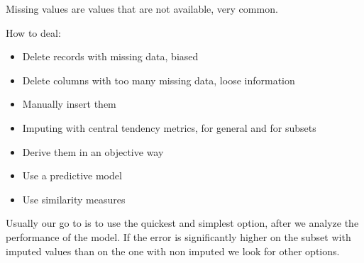 Missing values are values that are not available, very common. 

How to deal:
\begin{itemize}
    \item Delete records with missing data, biased
    \item Delete columns with too many missing data, loose information
    \item Manually insert them
    \item Imputing with central tendency metrics, for general and for subsets
    \item Derive them in an objective way
    \item Use a predictive model
    \item Use similarity measures
\end{itemize}

\vspace{10pt}

Usually our go to is to use the quickest and simplest option, after we analyze the performance of the model.
If the error is significantly higher on the subset with imputed values than on the one with non imputed we look for other options.


